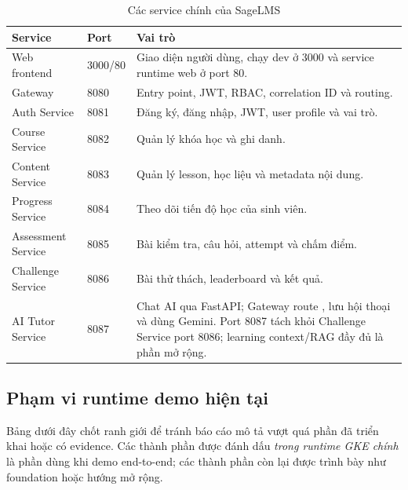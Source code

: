 \begin{table}[H]
\centering
\caption{Các service chính của SageLMS}
\label{tab:services}
\begin{tabularx}{\textwidth}{|p{}|p{}|Y|}
\hline
\textbf{Service} & \textbf{Port} & \textbf{Vai trò} \\
\hline
Web frontend & 3000/80 & Giao diện người dùng, chạy dev ở 3000 và service runtime web ở port 80. \\
Gateway & 8080 & Entry point, JWT, RBAC, correlation ID và routing. \\
Auth Service & 8081 & Đăng ký, đăng nhập, JWT, user profile và vai trò. \\
Course Service & 8082 & Quản lý khóa học và ghi danh. \\
Content Service & 8083 & Quản lý lesson, học liệu và metadata nội dung. \\
Progress Service & 8084 & Theo dõi tiến độ học của sinh viên. \\
Assessment Service & 8085 & Bài kiểm tra, câu hỏi, attempt và chấm điểm. \\
Challenge Service & 8086 & Bài thử thách, leaderboard và kết quả. \\
AI Tutor Service & 8087 & Chat AI qua FastAPI; Gateway route , lưu hội thoại và dùng Gemini. Port 8087 tách khỏi Challenge Service port 8086; learning context/RAG đầy đủ là phần mở rộng. \\
\hline
\end{tabularx}
\end{table}

\subsection{Phạm vi runtime demo hiện tại}

Bảng dưới đây chốt ranh giới để tránh báo cáo mô tả vượt quá phần đã triển khai hoặc có evidence. Các thành phần được đánh dấu \textit{trong runtime GKE chính} là phần dùng khi demo end-to-end; các thành phần còn lại được trình bày như foundation hoặc hướng mở rộng.

